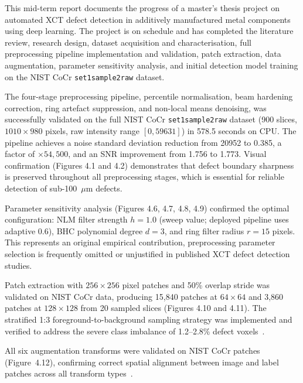 
This mid-term report documents the progress of a master's thesis project on automated XCT defect
detection in additively manufactured metal components using deep learning. The project is on
schedule and has completed the literature review, research design, dataset acquisition and
characterisation, full preprocessing pipeline implementation and validation, patch extraction, data
augmentation, parameter sensitivity analysis, and initial detection model training on the NIST CoCr
\texttt{set1sample2raw} dataset.

The four-stage preprocessing pipeline, percentile normalisation, beam hardening correction, ring
artefact suppression, and non-local means denoising, was successfully validated on the full NIST CoCr
\texttt{set1sample2raw} dataset (900 slices, $1010\times980$ pixels, raw intensity range
$[0, 59631]$) in 578.5 seconds on CPU. The pipeline achieves a noise standard deviation reduction
from 20952 to 0.385, a factor of $\times 54{,}500$, and an SNR improvement from 1.756 to 1.773.
Visual confirmation (Figures 4.1 and 4.2) demonstrates that defect boundary sharpness is preserved
throughout all preprocessing stages, which is essential for reliable detection of sub-100~$\mu$m
defects.

Parameter sensitivity analysis (Figures 4.6, 4.7, 4.8, 4.9) confirmed the optimal configuration: NLM
filter strength $h = 1.0$ (sweep value; deployed pipeline uses adaptive 0.6), BHC polynomial degree
$d = 3$, and ring filter radius $r = 15$ pixels. This represents an original empirical contribution,
preprocessing parameter selection is frequently omitted or unjustified in published XCT defect
detection studies.

Patch extraction with $256\times256$ pixel patches and 50\% overlap stride was validated on NIST CoCr
data, producing 15,840 patches at $64\times64$ and 3,860 patches at $128\times128$ from 20 sampled
slices (Figures 4.10 and 4.11). The stratified 1:3 foreground-to-background sampling strategy was
implemented and verified to address the severe class imbalance of 1.2--2.8\% defect
voxels~\citep{Sudre2017}.

All six augmentation transforms were validated on NIST CoCr patches (Figure~4.12), confirming correct
spatial alignment between image and label patches across all transform types~\citep{Bellens2021}.

